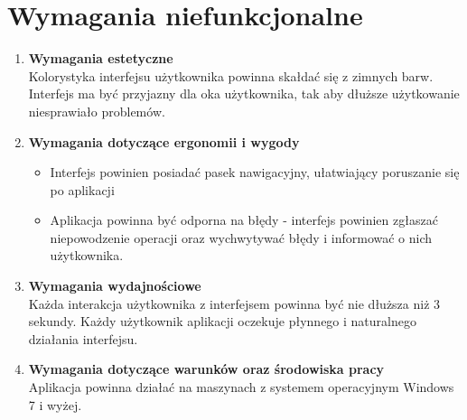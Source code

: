 \section{Wymagania niefunkcjonalne}
\begin{enumerate}
    \item \textbf{Wymagania estetyczne} \\
    Kolorystyka interfejsu użytkownika powinna skałdać się z zimnych barw. Interfejs ma być przyjazny dla oka użytkownika, tak aby dłuższe użytkowanie niesprawiało problemów.
    \\
    \item \textbf{Wymagania dotyczące ergonomii i wygody}
    \begin{itemize}
        \item Interfejs powinien posiadać pasek nawigacyjny, ułatwiający poruszanie się po aplikacji
        \item Aplikacja powinna być odporna na błędy - interfejs powinien zgłaszać niepowodzenie operacji oraz wychwytywać błędy i informować o nich użytkownika. \\
    \end{itemize}
    
    \item \textbf{Wymagania wydajnościowe}\\
    Każda interakcja użytkownika z interfejsem powinna być nie dłuższa niż 3 sekundy. Każdy użytkownik aplikacji oczekuje płynnego i naturalnego działania interfejsu. \\
    
    \item \textbf{Wymagania dotyczące warunków oraz środowiska pracy}\\
    Aplikacja powinna działać na maszynach z systemem operacyjnym Windows 7 i wyżej.
\end{enumerate}